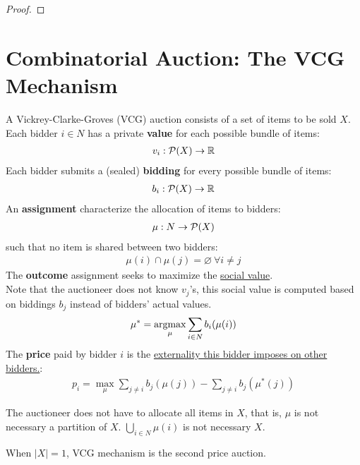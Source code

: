\documentclass{article}
\begin{document}
	\begin{proof}
	\end{proof}
	
	\section{Combinatorial Auction: The VCG Mechanism}
	\begin{definition}
		A Vickrey-Clarke-Groves (VCG) auction consists of a set of items to be sold $X$. Each bidder $i \in N$ has a private \textbf{value} for each possible bundle of items:
		\begin{align}
			v_i: \mathcal{{P}}(X) \to \mathbb{R}
		\end{align}
		Each bidder submits a (sealed) \textbf{bidding} for every possible bundle of items:
		\begin{align}
			b_i: \mathcal{{P}}(X) \to \mathbb{R}
		\end{align}
		An \textbf{assignment} characterize the allocation of items to bidders:
		\begin{align}
			\mu: N \to \mathcal{{P}}(X)
		\end{align}
		such that no item is shared between two bidders:
		\begin{align}
			\mu(i) \cap \mu(j) = \varnothing\ \forall i \neq j
		\end{align}
		The \textbf{outcome} assignment seeks to maximize the \ul{social value}. \\
		Note that the auctioneer does not know $v_j$'s, this social value is computed based on biddings $b_j$ instead of bidders' actual values.
		\begin{align}
			\mu^* = \operatorname*{argmax}_{\mu} \sum_{i \in N} b_i(\mu(i))
		\end{align}
		The \textbf{price} paid by bidder $i$ is the \ul{externality this bidder imposes on other bidders.}:
		\begin{align}
			p_i = \max_\mu \sum_{j \neq i} b_j(\mu(j)) - \sum_{j \neq i}b_j(\mu^*(j))
		\end{align}
	\end{definition}
	
	\begin{remark}
		The auctioneer does not have to allocate all items in $X$, that is, $\mu$ is not necessary a partition of $X$. $\bigcup_{i \in N}\mu(i)$ is not necessary $X$.
	\end{remark}
	
	\begin{remark}
		When $|X| = 1$, VCG mechanism is the second price auction.
	\end{remark}
	
\end{document}
